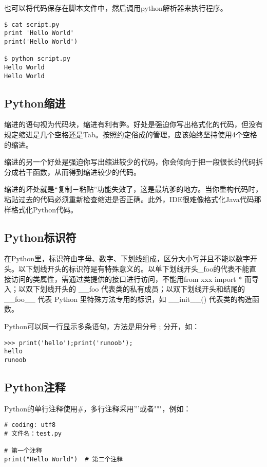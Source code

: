 也可以将代码保存在脚本文件中，然后调用python解析器来执行程序。
\begin{verbatim}
$ cat script.py
print 'Hello World'
print('Hello World')

$ python script.py
Hello World
Hello World
\end{verbatim}

\subsection{Python缩进}
缩进的语句视为代码块，缩进有利有弊。好处是强迫你写出格式化的代码，但没有规定缩进是几个空格还是Tab。按照约定俗成的管理，应该始终坚持使用4个空格的缩进。

缩进的另一个好处是强迫你写出缩进较少的代码，你会倾向于把一段很长的代码拆分成若干函数，从而得到缩进较少的代码。

缩进的坏处就是“复制－粘贴”功能失效了，这是最坑爹的地方。当你重构代码时，粘贴过去的代码必须重新检查缩进是否正确。此外，IDE很难像格式化Java代码那样格式化Python代码。


\subsection{Python标识符}
在Python里，标识符由字母、数字、下划线组成，区分大小写并且不能以数字开头。以下划线开头的标识符是有特殊意义的。以单下划线开头\_foo的代表不能直接访问的类属性，需通过类提供的接口进行访问，不能用from xxx import * 而导入；以双下划线开头的 \_\_foo 代表类的私有成员；以双下划线开头和结尾的 \_\_foo\_\_ 代表 Python 里特殊方法专用的标识，如 \_\_init\_\_() 代表类的构造函数。

Python可以同一行显示多条语句，方法是用分号 ; 分开，如：
\begin{verbatim}
>>> print('hello');print('runoob');
hello
runoob
\end{verbatim}

\subsection{Python注释}
Python的单行注释使用\#，多行注释采用'''或者"""，例如：
\begin{verbatim}
# coding: utf8
# 文件名：test.py

# 第一个注释
print("Hello World")  # 第二个注释
\end{verbatim}

